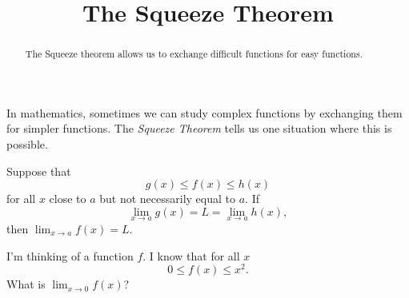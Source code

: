 \documentclass{ximera}
\title[Dig-In:]{The Squeeze Theorem}
\begin{document}
\begin{abstract}
The Squeeze theorem allows us to exchange difficult functions for easy functions.
\end{abstract}
\maketitle

In mathematics, sometimes we can study complex functions by exchanging
them for simpler functions. The \textit{Squeeze Theorem} tells us one
situation where this is possible.

\begin{theorem}
  Suppose that
  \[
  g(x) \le f(x) \le h(x)
  \]
  for all $x$ close to $a$ but not necessarily equal to $a$. If
  \[
  \displaystyle\lim_{x\to a} g(x) = L = \lim_{x\to a} h(x),
  \] 
  then $\displaystyle\lim_{x\to a} f(x) = L$.
\end{theorem}

\begin{question}
  I'm thinking of a function $f$. I know that for all $x$
  \[
  0 \le f(x) \le x^2.
  \]
  What is $\displaystyle\lim_{x\to 0} f(x)$?
  \begin{multipleChoice}
  \end{multipleChoice}
\end{question}
\end{document}
